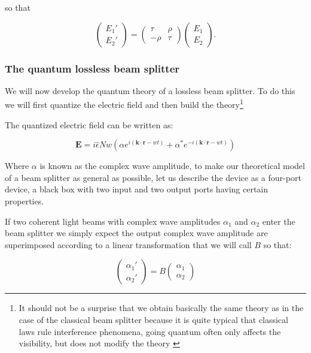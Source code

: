 \documentclass[11pt]{article}
\begin{document}
so that 

\begin{equation}
\begin{pmatrix} E_{1}' \\ E_{2}' \end{pmatrix}=\begin{pmatrix} \tau & \rho \\ -\rho & \tau \end{pmatrix} \begin{pmatrix} E_{1} \\ E_{2} \end{pmatrix}.
\end{equation}




\subsubsection{The quantum lossless beam splitter}

We will now develop the quantum theory of a lossless beam splitter. To do this we will first quantize the electric field and then build the theory\footnote{It should not be a surprise that we obtain basically the same theory as in the case of the classical beam splitter because it is quite typical that classical laws rule interference phenomena, going quantum often only affects the visibility, but does not modify the theory \cite{Leonhardt_2003} } 


The quantized electric field can be written as:

\begin{equation}
\mathbf{E}=i \hat{\epsilon}N w \left( \alpha e^{i (\mathbf{k \cdot r}-w t)}+\alpha^{*} e^{-i (\mathbf{k \cdot r}-w t)} \right)
\end{equation}

Where $\alpha$ is known as the complex wave amplitude, to make our theoretical model of a beam splitter as general as possible, let us describe the device as a four-port device, a black box with two input and two output ports having certain properties.

If two coherent light beams with complex wave amplitudes $\alpha_{1}$ and $\alpha_{2}$ enter the beam splitter we simply expect the output complex wave amplitude  are superimposed according to a linear transformation that we will call $B$ so that:

\begin{equation}
\begin{pmatrix} \alpha_{1}' \\ \alpha_{2}' \end{pmatrix}=B\begin{pmatrix} \alpha_{1} \\ \alpha_{2} \end{pmatrix}
\end{equation}
\end{document}
